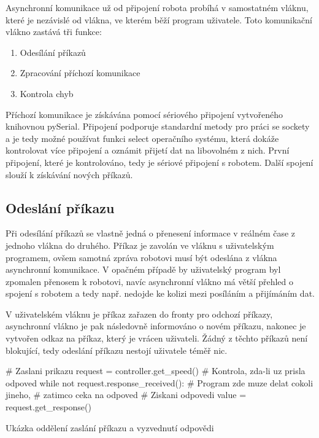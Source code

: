 \documentclass[12pt,notitlepage]{report}
\begin{document}
    Asynchronní komunikace už od připojení robota probíhá v samostatném vláknu,
    které je nezávislé od vlákna, ve kterém běží program uživatele. Toto
    komunikační vlákno zastává tři funkce:

    \begin{enumerate}
        \item Odesílání příkazů
        \item Zpracování příchozí komunikace
        \item Kontrola chyb
    \end{enumerate}

    Příchozí komunikace je získávána pomocí sériového připojení vytvořeného
    knihovnou pySerial. Připojení podporuje standardní metody pro práci se
    sockety a je tedy možné používat funkci select operačního systému, která
    dokáže kontrolovat více připojení a oznámit přijetí dat na libovolném z
    nich. První připojení, které je kontrolováno, tedy je sériové připojení s
    robotem. Další spojení slouží k získávání nových příkazů.

    \subsection{Odeslání příkazu}

    Při odesílání příkazů se vlastně jedná o přenesení informace v reálném čase
    z jednoho vlákna do druhého. Příkaz je zavolán ve vláknu s uživatelským
    programem, ovšem samotná zpráva robotovi musí být odeslána z vlákna
    asynchronní komunikace. V opačném případě by uživatelský program byl
    zpomalen přenosem k robotovi, navíc asynchronní vlákno má větší přehled o
    spojení s robotem a tedy např. nedojde ke kolizi mezi posíláním a
    přijímáním dat.

    V uživatelském vláknu je příkaz zařazen do fronty pro odchozí příkazy,
    asynchronní vlákno je pak následovně informováno o novém příkazu, nakonec
    je vytvořen odkaz na příkaz, který je vrácen uživateli. Žádný z těchto
    příkazů není blokující, tedy odeslání příkazu nestojí uživatele téměř nic.

    \begin{listing}[H]
    \begin{pyc}
# Zaslani prikazu
request = controller.get_speed()
# Kontrola, zda-li uz prisla odpoved
while not request.response_received():
    # Program zde muze delat cokoli jineho,
    # zatimco ceka na odpoved
# Ziskani odpovedi
value = request.get_response()
    \end{pyc}
    \caption{Ukázka oddělení zaslání příkazu a vyzvednutí odpovědi}
    \end{listing}
\end{document}
